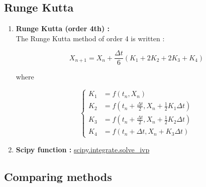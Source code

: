 \documentclass[12pt]{article}
\begin{document}
	\subsection{Runge Kutta}
	
	\begin{enumerate}[label=\textbullet]
		\item \textbf{Runge Kutta (order 4th) :} \\
		The Runge Kutta method of order 4 is written :
		
		$$X_{n+1}=X_n+\frac{\Delta t}{6}\left(K_1+2K_2+2K_3+K_4\right)$$
		
		\noindent where 
		
		$$\left\{\begin{aligned}
			K_1&=f(t_n,X_n) \\
			K_2&=f\left(t_n+\frac{\Delta t}{2},X_n+\frac{1}{2} K_1\Delta t\right) \\
			K_3&=f\left(t_n+\frac{\Delta t}{2},X_n+\frac{1}{2} K_2\Delta t\right) \\
			K_4&=f\left(t_n+\Delta t,X_n+K_3\Delta t\right)
		\end{aligned}\right.$$
		\item \textbf{Scipy function :} \href{https://docs.scipy.org/doc/scipy/reference/generated/scipy.integrate.solve_ivp.html#scipy.integrate.solve_ivp}{scipy.integrate.solve\_ivp}
	\end{enumerate}

	\subsection{Comparing methods}
	
\end{document}
